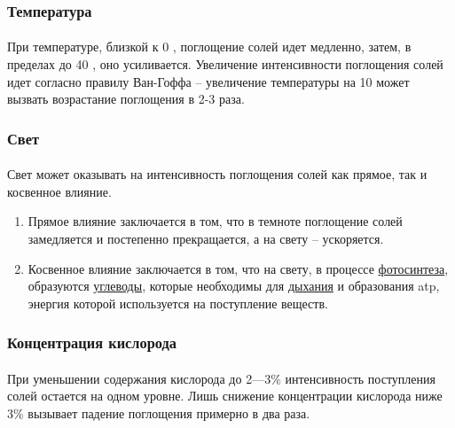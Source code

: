 \subsubsection*{Температура}

\paragraph*{}При температуре, близкой к 0 \celsius, поглощение солей идет медленно, затем, в пределах до 40 \celsius, оно усиливается. Увеличение интенсивности поглощения солей идет согласно правилу Ван-Гоффа -- увеличение температуры на 10 \celsius может вызвать возрастание поглощения в 2-3 раза.

\subsubsection*{Свет}

\paragraph*{}Свет может оказывать на интенсивность поглощения солей как прямое, так и косвенное влияние.

\begin{enumerate}
	\item Прямое влияние заключается в том, что в темноте поглощение солей замедляется и постепенно прекращается, а на свету -- ускоряется. 
	\item Косвенное влияние заключается в том, что на свету, в процессе \hyperlink{photosyntesis}{фотосинтеза}, образуются \hyperlink{sect_glycosids}{углеводы}, которые необходимы для \hyperlink{sect_breazing}{дыхания} и образования \gls{atp}, энергия которой используется на поступление веществ. 
\end{enumerate}

\subsubsection*{Концентрация кислорода}

\paragraph*{}При уменьшении содержания кислорода до 2—3\% интенсивность поступления солей остается на одном уровне. Лишь снижение концентрации кислорода ниже 3\% вызывает падение поглощения примерно в два раза. 

